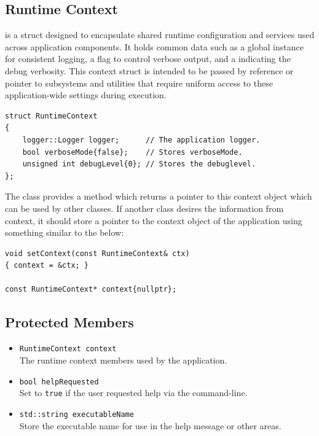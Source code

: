 \subsection{Runtime Context}
 is a struct designed to encapsulate shared runtime configuration and services used across application components. It holds common data such as a global  instance for consistent logging, a  flag to control verbose output, and a  indicating the debug verbosity. This context struct is intended to be passed by reference or pointer to subsystems and utilities that require uniform access to these application-wide settings during execution.
\begin{lstlisting}[style=cppstyle]
struct RuntimeContext
{
	logger::Logger logger;      // The application logger.
	bool verboseMode{false};    // Stores verboseMode.
	unsigned int debugLevel{0}; // Stores the debuglevel.
};
\end{lstlisting}
The  class provides a  method which returns a pointer to this context object which can be used by other classes. If another class desires the information from context, it should store a pointer to the context object of the application using something similar to the below:
\begin{lstlisting}[style=cppstyle]
void setContext(const RuntimeContext& ctx) 
{ context = &ctx; }

const RuntimeContext* context{nullptr};
\end{lstlisting}


\subsection{Protected Members}
\begin{itemize}\itemsep0em
	\item \texttt{RuntimeContext context} \\
	The runtime context members used by the application.
	\item \texttt{bool helpRequested} \\
	Set to \texttt{true} if the user requested help via the command-line.
	\item \texttt{std::string executableName} \\
	Store the executable name for use in the help message or other areas.
\end{itemize}

